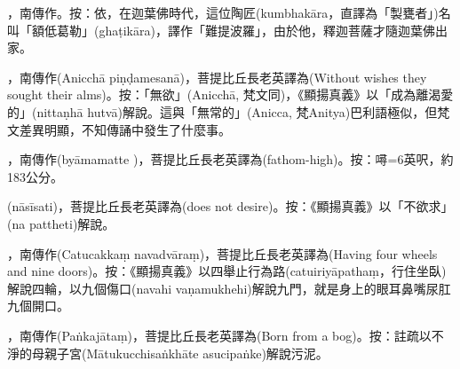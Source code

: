 \startitemgroup[noteitems]
\item{}，南傳作。按：依，在迦葉佛時代，這位陶匠(kumbhakāra，直譯為「製甕者」)名叫「額低葛勒」(ghaṭikāra)，譯作「難提波羅」，由於他，釋迦菩薩才隨迦葉佛出家。
\stopitemgroup

\startitemgroup[noteitems]
\item{}，南傳作(Anicchā piṇḍamesanā)，菩提比丘長老英譯為(Without wishes they sought their alms)。按：「無欲」(Anicchā, 梵文同)，《顯揚真義》以「成為離渴愛的」(nittaṇhā hutvā)解說。這與「無常的」(Anicca, 梵Anitya)巴利語極似，但梵文差異明顯，不知傳誦中發生了什麼事。
\stopitemgroup

\startitemgroup[noteitems]
\item{}，南傳作(byāmamatte )，菩提比丘長老英譯為(fathom-high)。按：噚=6英呎，約183公分。
\stopitemgroup

\startitemgroup[noteitems]
\item{}(nāsīsati)，菩提比丘長老英譯為(does not desire)。按：《顯揚真義》以「不欲求」(na pattheti)解說。
\stopitemgroup

\startitemgroup[noteitems]
\item{}，南傳作(Catucakkaṃ navadvāraṃ)，菩提比丘長老英譯為(Having four wheels and nine doors)。按：《顯揚真義》以四舉止行為路(catuiriyāpathaṃ，行住坐臥)解說四輪，以九個傷口(navahi vaṇamukhehi)解說九門，就是身上的眼耳鼻嘴尿肛九個開口。
\stopitemgroup

\startitemgroup[noteitems]
\item{}，南傳作(Paṅkajātaṃ)，菩提比丘長老英譯為(Born from a bog)。按：註疏以不淨的母親子宮(Mātukucchisaṅkhāte asucipaṅke)解說污泥。
\stopitemgroup

